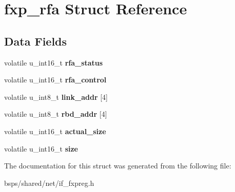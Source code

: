 \hypertarget{structfxp__rfa}{}\section{fxp\+\_\+rfa Struct Reference}
\label{structfxp__rfa}
\subsection*{Data Fields}
\begin{DoxyCompactItemize}
\item 
\mbox{\label{structfxp__rfa_a6ae5e52bea761dd1b03177c8668eade0}} 
volatile u\+\_\+int16\+\_\+t {\bfseries rfa\+\_\+status}
\item 
\mbox{\label{structfxp__rfa_a4666cc4d1f7f0be70c40bf4f25af0dd1}} 
volatile u\+\_\+int16\+\_\+t {\bfseries rfa\+\_\+control}
\item 
\mbox{\label{structfxp__rfa_aff8275f28840cbe4cd82642adf45693e}} 
volatile u\+\_\+int8\+\_\+t {\bfseries link\+\_\+addr} \mbox{[}4\mbox{]}
\item 
\mbox{\label{structfxp__rfa_ad6b908abceef026456acc4bc12e9f8de}} 
volatile u\+\_\+int8\+\_\+t {\bfseries rbd\+\_\+addr} \mbox{[}4\mbox{]}
\item 
\mbox{\label{structfxp__rfa_a0141324b121f5884b0b3f3d35ab7d108}} 
volatile u\+\_\+int16\+\_\+t {\bfseries actual\+\_\+size}
\item 
\mbox{\label{structfxp__rfa_a3d5204dfb9842848746b6f03093842dc}} 
volatile u\+\_\+int16\+\_\+t {\bfseries size}
\end{DoxyCompactItemize}


The documentation for this struct was generated from the following file\+:\begin{DoxyCompactItemize}
\item 
bsps/shared/net/if\+\_\+fxpreg.\+h\end{DoxyCompactItemize}
